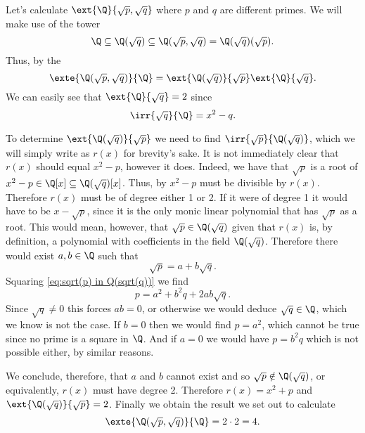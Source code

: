 \documentclass[12pt,oneside]{book}
\begin{document}
\begin{example}
	Let's calculate \( \ext{\Q}{\sqrt{p}, \sqrt{q}} \) where \( p \) and \( q \) are
	different primes.	We will make use of the tower
	\begin{equation*}
		\Q \subseteq \Q(\sqrt{q}) \subseteq \Q(\sqrt{p}, \sqrt{q}) = \Q(\sqrt{q})(\sqrt{p}).
	\end{equation*}
	Thus, by the 
	\begin{equation*}
		\exte{\Q(\sqrt{p}, \sqrt{q})}{\Q} = \ext{\Q(\sqrt{q})}{\sqrt{p}} \ext{\Q}{\sqrt{q}}.
	\end{equation*}
	We can easily see that \( \ext{\Q}{\sqrt{q}} = 2 \) since
	\begin{equation*}
		\irr{\sqrt{q}}{\Q} = x^2 - q.
	\end{equation*}

	To determine \( \ext{\Q(\sqrt{q})}{\sqrt{p}} \) we need to find \(
	\irr{\sqrt{p}}{\Q(\sqrt{q})} \), which we will simply write as \( r(x) \) for brevity's
	sake. It is not immediately clear that \( r(x) \) should equal \( x^2 -
	p\), however it does. Indeed, we have that \( \sqrt{p} \) is a root of \( x^2 - p \in
	\Q[x] \subseteq \Q(\sqrt{q})[x] \). Thus, by  \( x^2 - p \) must be divisible by \( r(x) \). Therefore \( r(x) \) must be
	of degree either 1 or 2. If it were of degree 1 it would have to be \( x - \sqrt{p} \),
	since it is the only monic linear polynomial that has \( \sqrt{p} \) as a root. This
	would mean, however, that \( \sqrt{p} \in \Q(\sqrt{q}) \) given that \( r(x) \) is,
	by definition, a polynomial with coefficients in the field \( \Q(\sqrt{q}) \). Therefore
	there would exist \( a, b \in \Q \) such that
	\begin{equation}\label{eq:sqrt(p) in Q(sqrt(q))}
		\sqrt{p} = a + b\sqrt{q}.
	\end{equation}
	Squaring \cref{eq:sqrt(p) in Q(sqrt(q))} we find
	\begin{equation*}
		p = a^2 + b^2q + 2ab\sqrt{q}.
	\end{equation*}
	Since \( \sqrt{q} \neq 0 \) this forces \( ab = 0 \), or otherwise we would deduce \(
	\sqrt{q} \in \Q \), which we know is not the case. If \( b = 0 \) then we would find \(
	p = a^2 \), which cannot be true since no prime is a square in \( \Q \). And if \( a = 0
	\) we would have \( p = b^2q \) which is not possible either, by similar reasons.

	We conclude,  therefore, that \( a \) and \( b \) cannot exist and so \( \sqrt{p} \notin
	\Q(\sqrt{q}) \), or equivalently, \( r(x) \) must have degree 2. Therefore \( r(x) = x^2
	+ p \) and \( \ext{\Q(\sqrt{q})}{\sqrt{p}} = 2 \). Finally we obtain the result we set
	out to calculate
	\begin{equation*}
		\exte{\Q(\sqrt{p}, \sqrt{q})}{\Q} = 2 \cdot 2 = 4.
	\end{equation*}
\end{example}
\end{document}
